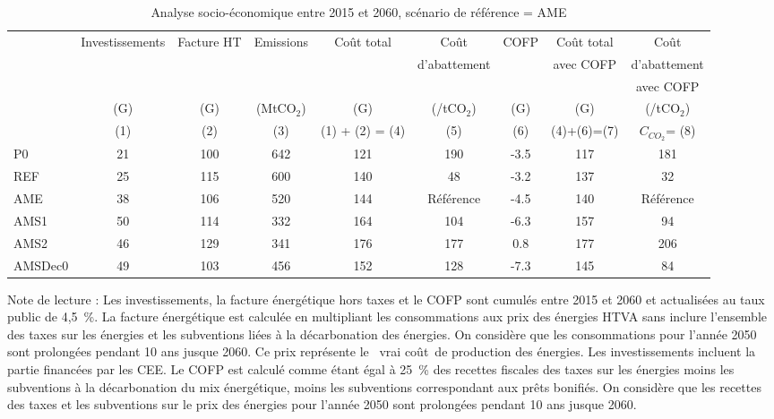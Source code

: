 \documentclass[10.5pt,a4paper]{article}
\def\euro{\mbox{\raisebox{.25ex}{{\it =}}\hspace{-.5em}{\sf C}}}
\begin{document}
{\begin{table}[h] \caption{Analyse socio-économique entre 2015 et 2060, scénario de référence  = AME}\label{Bilan_socio} 
\begin{center}
\scriptsize
\begin{tabular}[c]{|l|c|c|c|c|c|c|c|c|}
\hline
			& Investissements	& Facture HT & Emissions	& Coût total  &	Coût 						& COFP	&Coût total	& Coût 					 \\
			&									&						 & 						&							&	d'abattement		&				&avec COFP	& d'abattement 	 \\	
			&									&						 &						&							&					&				&						&	avec COFP 				\\
			&		(G\euro)			&		(G\euro) &	(MtCO$_2$)&	(G\euro)		&	(\euro/tCO$_2$)	&	(G\euro) & (G\euro) & 	(\euro/tCO$_2$)	 \\
			&   (1) 					&    (2) 		 &   (3) 			&  (1) + (2) = (4)  &  		(5)			& 	(6)		&    (4)+(6)=(7)       &      $C_{CO_2}$= (8)          \\
\hline
P0		&		21 &100 &642 &121 &190 &-3.5 &117 &181 \\

REF		&		25 &115 &600 &140 &48 &-3.2 &137 &32 \\

AME		&		38 &106 &520&144 & Référence &-4.5 &140 & Référence  \\

AMS1	&		50 &114 &332 &164 &104 &-6.3 &157 &94 \\

AMS2	&		46 &129 &341 &176 &177 &0.8 &177 &206 \\

AMSDec0	&	49 &103 &456 &152 &128 &-7.3 &145 &84\\
\hline
\end{tabular}
\end{center}
\footnotesize{Note de lecture : Les investissements, la facture énergétique hors taxes  et le COFP sont cumulés entre 2015 et 2060 et actualisées au taux public de 4,5~\%.  La facture énergétique est calculée en multipliant les consommations aux prix des énergies HTVA  sans inclure l'ensemble des taxes sur les énergies et les subventions liées à la décarbonation des énergies. On considère que les consommations pour l'année 2050 sont prolongées pendant 10 ans jusque 2060. Ce prix représente le \og~vrai coût~\fg de production des énergies. Les investissements incluent la partie financées par les CEE. Le COFP est calculé comme étant égal à 25~\% des recettes fiscales des taxes sur les énergies moins les subventions à la décarbonation du mix énergétique, moins les subventions correspondant aux prêts bonifiés. On considère que les recettes des taxes et les subventions sur le prix des énergies pour l'année 2050 sont prolongées pendant 10 ans jusque 2060.}


\end{table}}
\end{document}
